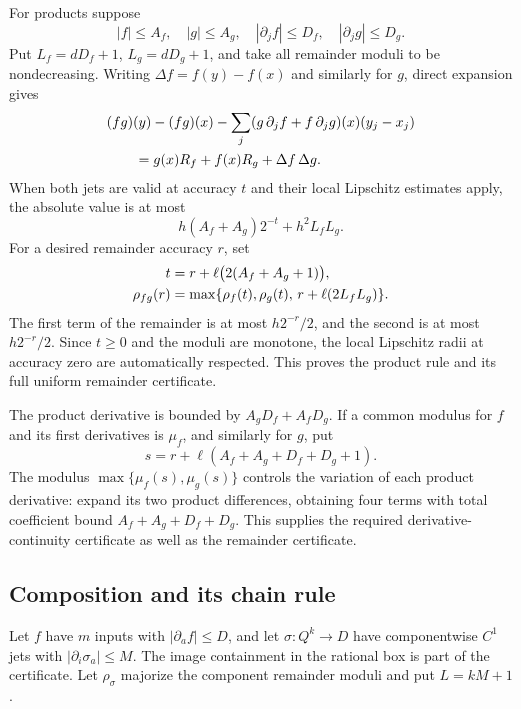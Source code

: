 For products suppose
\[
 |f|\le A_f,\quad |g|\le A_g,\quad
 |\partial_jf|\le D_f,\quad|\partial_jg|\le D_g.
\]
Put $L_f=dD_f+1$, $L_g=dD_g+1$, and take all remainder moduli to be
nondecreasing. Writing $\Delta f=f(y)-f(x)$ and similarly for $g$, direct
expansion gives
\begin{align}
 &(fg)(y)-(fg)(x)
       -\sum_j(g\,\partial_jf+f\,\partial_jg)(x)(y_j-x_j)\notag\\
 &\hspace{2em}=g(x)R_f+f(x)R_g+\Delta f\,\Delta g.
 \label{eq:product-remainder}
\end{align}
When both jets are valid at accuracy $t$ and their local Lipschitz estimates
apply, the absolute value is at most
\[
 h(A_f+A_g)2^{-t}+h^2L_fL_g.
\]
For a desired remainder accuracy $r$, set
\begin{align}
 t&=r+\ell\bigl(2(A_f+A_g+1)\bigr),\notag\\
 \rho_{fg}(r)
 &=\max\{\rho_f(t),\rho_g(t),\,r+\ell(2L_fL_g)\}.
 \label{eq:product-modulus}
\end{align}
The first term of the remainder is at most $h2^{-r}/2$, and the second
is at most $h2^{-r}/2$. Since $t\ge0$ and the moduli are monotone,
the local Lipschitz radii at accuracy zero are automatically respected.
This proves the product rule and its full uniform remainder certificate.

The product derivative is bounded by $A_gD_f+A_fD_g$. If a common
modulus for $f$ and its first derivatives is $\mu_f$, and similarly for
$g$, put
\[
 s=r+\ell(A_f+A_g+D_f+D_g+1).
\]
The modulus $\max\{\mu_f(s),\mu_g(s)\}$ controls the variation of each
product derivative: expand its two product differences, obtaining four
terms with total coefficient bound
$A_f+A_g+D_f+D_g$. This supplies the required derivative-continuity
certificate as well as the remainder certificate.

\subsection{Composition and its chain rule}\label{sec:chain-rule}

Let $f$ have $m$ inputs with $|\partial_af|\le D$, and let
$\sigma:Q^k\to D$ have componentwise $C^1$ jets with
$|\partial_i\sigma_a|\le M$. The image containment in the rational box is
part of the certificate. Let $\rho_\sigma$ majorize the component
remainder moduli and put $L=kM+1$.

